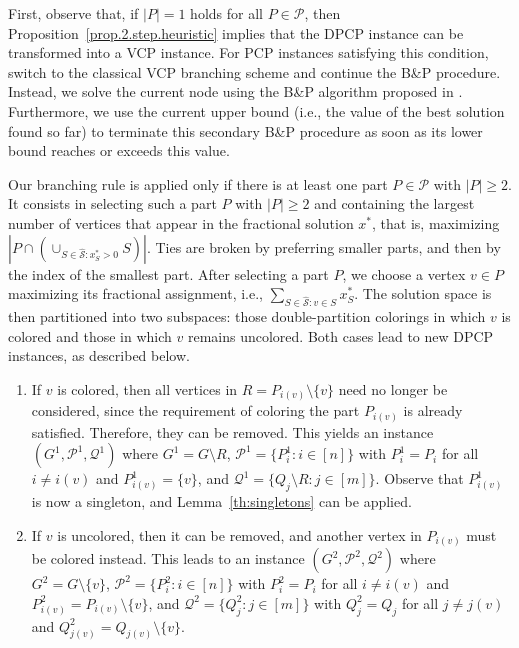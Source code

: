 \documentclass[preprint, 11pt, authoryear]{elsarticle}
\newcommand{\PP}{{\mathcal P}}
\newcommand{\QQ}{{\mathcal Q}}
\newcommand{\STAB}{{\mathscr S}}
\newcommand{\card}[1]{\left| #1 \right|}
\begin{document}


First, observe that, if $\card{P}=1$ holds for all $P\in\PP$, then Proposition~\ref{prop.2.step.heuristic} implies that the DPCP instance can be transformed into a VCP instance. 
For PCP instances satisfying this condition, \cite{Furini2018} 
switch to the classical VCP branching scheme and continue the B\&P procedure. Instead, we solve the current node using the B\&P algorithm proposed in \cite{Held2012}. Furthermore, we use the current upper bound (i.e., the value of the best solution found so far) to terminate this secondary B\&P procedure as soon as its lower bound reaches or exceeds this value. 

Our branching rule is applied only if there is at least one part $P\in \PP$ with $\card{P} \geq 2$. It consists in 
selecting such a part $P$ with $|P| \geq 2$ and containing the largest number of vertices that appear in the fractional solution $x^*$, that is, maximizing 
$
\left|P\cap (\cup_{S\in\hat{\STAB}: x^*_S>0}S)\right|
$. 
Ties are broken by preferring smaller parts, and then by the index of the smallest part.
After selecting a part $P$, we choose a vertex $v\in P$ maximizing its fractional assignment, i.e., $\sum_{S\in\hat{\STAB}:v\in S}x^*_S$.
The solution space is then partitioned into two subspaces: those double-partition colorings in which $v$ is colored and those in which $v$ remains uncolored.
Both cases lead to new DPCP instances, as described below.
\begin{enumerate}
\item If $v$ is colored, then all vertices in $R=P_{i(v)}\setminus\{v\}$ need no longer be considered, since the requirement of coloring the part $P_{i(v)}$ is already satisfied.
Therefore, they can be removed.
This yields an instance $(G^1,\PP^1,\QQ^1)$ where $G^1=G\setminus R$, $\PP^1=\{P^1_i:i\in[n]\}$ with $P^1_i=P_i$ for all $i\neq i(v)$ and $P^1_{i(v)}=\{v\}$, and $\QQ^1=\{Q_j\setminus R:j\in[m]\}$.
Observe that $P^1_{i(v)}$ is now a singleton, and Lemma~\ref{th:singletons} can be applied.

\item If $v$ is uncolored, then it can be removed, and another vertex in $P_{i(v)}$ must be colored instead.
This leads to an instance $(G^2,\PP^2,\QQ^2)$ where $G^2=G\setminus\{v\}$, $\PP^2=\{P^2_i:i\in[n]\}$ with $P^2_i=P_i$ for all $i\neq i(v)$ and $P^2_{i(v)}=P_{i(v)}\setminus\{v\}$, and $\QQ^2=\{Q^2_j:j\in[m]\}$ with $Q^2_j=Q_j$ for all $j\neq j(v)$ and $Q^2_{j(v)}=Q_{j(v)}\setminus\{v\}$.
\end{enumerate}
\end{document}

